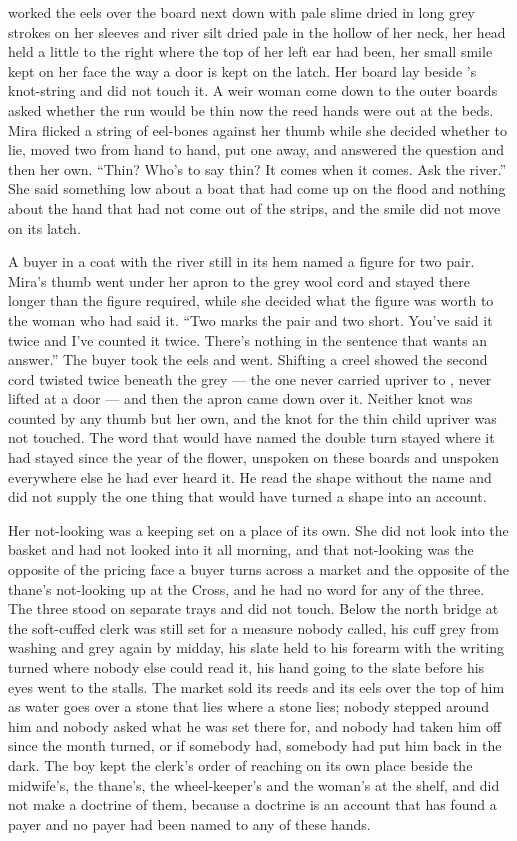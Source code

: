  worked the eels over the board next down with pale slime dried in long grey strokes on her sleeves and river silt dried pale in the hollow of her neck, her head held a little to the right where the top of her left ear had been, her small smile kept on her face the way a door is kept on the latch. Her board lay beside 's knot-string and did not touch it. A weir woman come down to the outer boards asked whether the run would be thin now the reed hands were out at the beds. Mira flicked a string of eel-bones against her thumb while she decided whether to lie, moved two from hand to hand, put one away, and answered the question and then her own. “Thin? Who's to say thin? It comes when it comes. Ask the river.” She said something low about a boat that had come up on the flood and nothing about the hand that had not come out of the strips, and the smile did not move on its latch.

A buyer in a coat with the river still in its hem named a figure for two pair. Mira's thumb went under her apron to the grey wool cord and stayed there longer than the figure required, while she decided what the figure was worth to the woman who had said it. “Two marks the pair and two short. You've said it twice and I've counted it twice. There's nothing in the sentence that wants an answer.” The buyer took the eels and went. Shifting a creel showed the second cord twisted twice beneath the grey --- the one never carried upriver to , never lifted at a door --- and then the apron came down over it. Neither knot was counted by any thumb but her own, and the knot for the thin child upriver was not touched. The word that would have named the double turn stayed where it had stayed since the year of the flower, unspoken on these boards and unspoken everywhere else he had ever heard it. He read the shape without the name and did not supply the one thing that would have turned a shape into an account.

Her not-looking was a keeping set on a place of its own. She did not look into the basket and had not looked into it all morning, and that not-looking was the opposite of the pricing face a buyer turns across a market and the opposite of the thane's not-looking up at the Cross, and he had no word for any of the three. The three stood on separate trays and did not touch. Below the north bridge at  the soft-cuffed clerk was still set for a measure nobody called, his cuff grey from washing and grey again by midday, his slate held to his forearm with the writing turned where nobody else could read it, his hand going to the slate before his eyes went to the stalls. The market sold its reeds and its eels over the top of him as water goes over a stone that lies where a stone lies; nobody stepped around him and nobody asked what he was set there for, and nobody had taken him off since the month turned, or if somebody had, somebody had put him back in the dark. The boy kept the clerk's order of reaching on its own place beside the midwife's, the thane's, the wheel-keeper's and the woman's at the shelf, and did not make a doctrine of them, because a doctrine is an account that has found a payer and no payer had been named to any of these hands.

